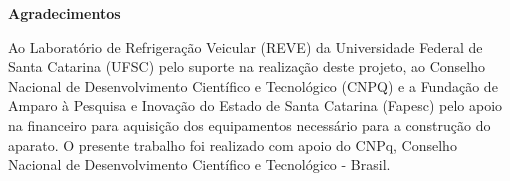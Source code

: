 \onehalfspacing
\newpage
\begin{center}
    \textbf{Agradecimentos}
\end{center}

{

Ao Laboratório de Refrigeração Veicular (REVE) da Universidade Federal de Santa Catarina (UFSC) pelo suporte na realização deste projeto, ao Conselho Nacional de Desenvolvimento Científico e Tecnológico (CNPQ) e a Fundação de Amparo à Pesquisa e Inovação do Estado de Santa Catarina (Fapesc) pelo apoio na financeiro para aquisição dos equipamentos necessário para a construção do aparato.
O presente trabalho foi realizado com apoio do CNPq, Conselho Nacional de Desenvolvimento Científico e Tecnológico - Brasil.
}
